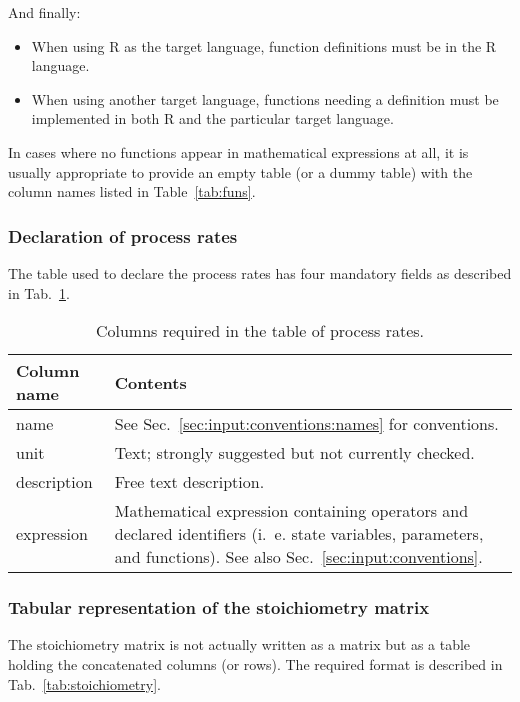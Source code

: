 \documentclass[a4paper]{article}
\begin{document}
And finally:

\begin{itemize}
 \item When using R as the target language, function definitions must be in the R language.
 \item When using another target language, functions needing a definition must be implemented in both R and the particular target language.
\end{itemize}

In cases where no functions appear in mathematical expressions at all, it is usually appropriate to provide an empty table (or a dummy table) with the column names listed in Table~\ref{tab:funs}.

\subsubsection{Declaration of process rates} \label{sec:input:tables:processes}

The table used to declare the process rates has four mandatory fields as described in Tab.~\ref{tab:processes}.

\begin{table}[!h]
  \caption{Columns required in the table of process rates. \label{tab:processes}}
  \begin{tabular}{lp{}} \hline\hline
    \textbf{Column name} & \textbf{Contents} \\ \hline
    name & See Sec.~\ref{sec:input:conventions:names} for conventions. \\
    unit & Text; strongly suggested but not currently checked. \\
    description & Free text description. \\
    expression & Mathematical expression containing operators and declared identifiers (i.~e. state variables, parameters, and functions). See also Sec.~\ref{sec:input:conventions}. \\
    \hline
  \end{tabular}
\end{table}

\subsubsection{Tabular representation of the stoichiometry matrix} \label{sec:input:tables:stoichiometry}

The stoichiometry matrix is not actually written as a matrix but as a table holding the concatenated columns (or rows). The required format is described in  Tab.~\ref{tab:stoichiometry}.
\end{document}
